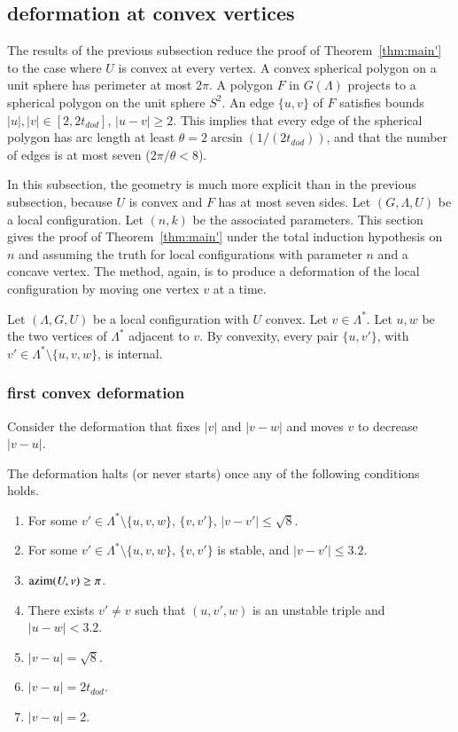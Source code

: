 \subsection{deformation at convex vertices}

The results of the previous subsection
reduce the proof of Theorem~\ref{thm:main'} to
the case where $U$ is convex at every vertex.  A convex
spherical polygon on a unit sphere has perimeter
at most $2\pi$.  A polygon $F$ in $G(\Lambda)$ projects to
a spherical polygon on the unit sphere $S^2$.  An edge $\{u,v\}$ of
$F$ satisfies bounds $|u|,|v|\in[2,2t_{dod}]$, $|u-v|\ge 2$. This
implies that every edge of the spherical polygon has arc length
at least $\theta=2\arcsin(1/(2t_{dod}))$, and that the number
of edges is at most seven ($2\pi/\theta < 8$).

In this subsection, the geometry is much more explicit than in the
previous subsection, because $U$ is convex and $F$ has at most seven sides.
Let $(G,\Lambda,U)$ be a local configuration.
Let $(n,k)$ be the associated parameters.
This section gives the proof of Theorem~\ref{thm:main'} under 
the total induction hypothesis on $n$ and assuming the truth
for local configurations with parameter $n$ and a concave vertex.
The method, again, is to produce a deformation of the local
configuration by moving one vertex $v$ at a time.



Let $(\Lambda,G,U)$ be a local configuration with $U$ convex.
Let $v\in\Lambda^*$.  
Let $u,w$ be the two vertices of $\Lambda^*$
adjacent to $v$.  By convexity, every pair $\{u,v'\}$,
with $v'\in\Lambda^*\setminus\{u,v,w\}$, is internal.


\subsubsection{first convex deformation}

Consider the deformation that fixes $|v|$ and $|v-w|$ and
moves $v$ to decrease $|v-u|$.  

The deformation halts (or never starts) once any
of the following conditions holds.
\begin{enumerate}\label{e:halt-convex}
\item For some $v'\in\Lambda^*\setminus\{u,v,w\}$, 
$\{v,v'\}$, $|v-v'|\le \sqrt8$.
\item For some $v'\in\Lambda^*\setminus\{u,v,w\}$,
$\{v,v'\}$ is  stable, and $|v-v'|\le 3.2$.
\item ${\operatorname{azim}}(U,v)\ge\pi$.
\item There exists $v'\ne v$ such that 
$(u,v',w)$ is an unstable triple and $|u-w|<3.2$.
\item $|v-u|=\sqrt8$.
\item $|v-u|=2t_{dod}$.
\item $|v-u|=2$.
\end{enumerate}

